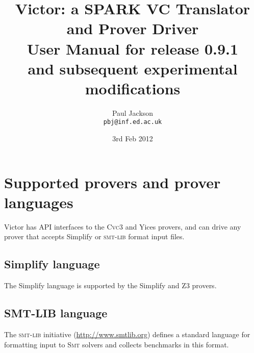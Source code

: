 \documentclass[12pt,fleqn]{article}
\title{Victor: a SPARK VC Translator and Prover Driver \\[4ex]
  \Large
  User Manual for release 0.9.1 \\
  and subsequent experimental modifications \\[1ex]
}
\author{Paul Jackson \\
        \texttt{pbj@inf.ed.ac.uk}}
\date{3rd Feb 2012}
\newcommand{\cvcthree}{\textsc{Cvc}3}
\newcommand{\zthree}{\textsc{Z}3}
\newcommand{\yices}{Yices}
\newcommand{\smt}{\textsc{Smt}}
\newcommand{\smtlib}{\textsc{smt-lib}}
\begin{document}
\maketitle


\tableofcontents


\setlength{\parskip}{0.8\baselineskip}


\section{Supported provers and prover languages}

Victor has API interfaces to the \cvcthree{} and \yices{} provers, and can
drive any prover that accepts Simplify or \smtlib{} format input files.

\subsection{Simplify language}

The Simplify language is supported by the Simplify and \zthree{} provers.

\subsection{SMT-LIB language}

The \smtlib{} initiative (\url{http://www.smtlib.org}) defines a
standard language for formatting input to \smt{} solvers and collects
benchmarks in this format.  
\end{document}
